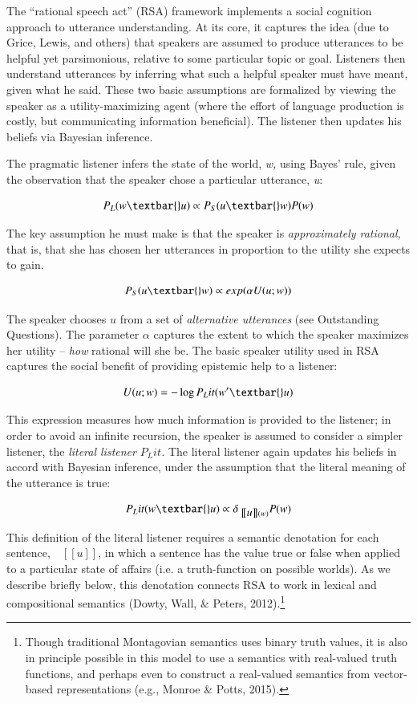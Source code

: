 \documentclass[]{elsarticle}
\newcommand{\denote}[1]{\mbox{ $[\![ #1 ]\!]$}}
\begin{document}
The ``rational speech act'' (RSA) framework implements a social
cognition approach to utterance understanding. At its core, it captures
the idea (due to Grice, Lewis, and others) that speakers are assumed to
produce utterances to be helpful yet parsimonious, relative to some
particular topic or goal. Listeners then understand utterances by
inferring what such a helpful speaker must have meant, given what he
said. These two basic assumptions are formalized by viewing the speaker
as a utility-maximizing agent (where the effort of language production
is costly, but communicating information beneficial). The listener then
updates his beliefs via Bayesian inference.

The pragmatic listener infers the state of the world, \emph{w,} using
Bayes' rule, given the observation that the speaker chose a particular
utterance, \emph{u}:

$$P_L(w\textbar{}u) \propto P_S(u\textbar{}w)P(w)$$

The key assumption he must make is that the speaker is
\emph{approximately rational,} that is, that she has chosen her
utterances in proportion to the utility she expects to gain.

$$P_S(u\textbar{}w) \propto exp(\alpha
U(u;w))$$

The speaker chooses $u$ from a set of \emph{alternative utterances}
(see Outstanding Questions). The parameter $\alpha$
captures the extent to which the speaker maximizes her utility --
\emph{how} rational will she be. The basic speaker utility used in RSA
captures the social benefit of providing epistemic help to a listener:

$$U(u;w) = -\log P_Lit(w'\textbar{}u)$$

This expression measures how much information is provided to the
listener; in order to avoid an infinite recursion, the speaker is
assumed to consider a simpler listener, the \emph{literal listener}
$P_Lit$\emph{.} The literal listener again updates his beliefs in
accord with Bayesian inference, under the assumption that the literal
meaning of the utterance is true:

$$P_Lit(w\textbar{}u) \propto
\delta_{\denote{u}(w)}P(w)$$

This definition of the literal listener requires a semantic denotation
for each sentence, $\denote{u}$, in which a sentence
has the value true or false when applied to a particular state of
affairs (i.e. a truth-function on possible worlds). As we describe
briefly below, this denotation connects RSA to work in lexical and
compositional semantics (Dowty, Wall, \& Peters, 2012).\footnote{Though
  traditional Montagovian semantics uses binary truth values, it is also
  in principle possible in this model to use a semantics with
  real-valued truth functions, and perhaps even to construct a
  real-valued semantics from vector-based representations (e.g., Monroe
  \& Potts, 2015).}
\end{document}
